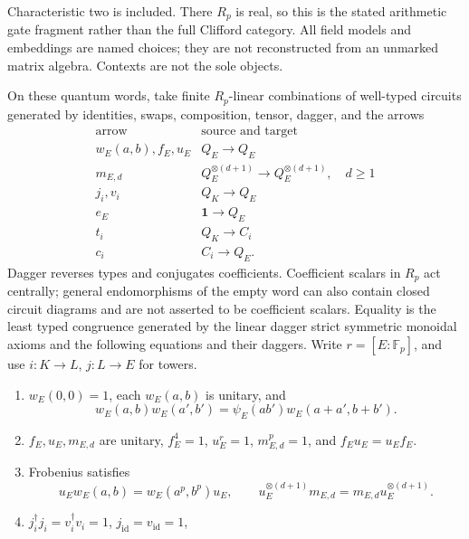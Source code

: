 \begin{scope}
Characteristic two is included. There $R_p$ is real, so this is the stated
arithmetic gate fragment rather than the full Clifford category. All field
models and embeddings are named choices; they are not reconstructed from an
unmarked matrix algebra. Contexts are not the sole objects.
\end{scope}

\begin{definition}
On these quantum words, take finite $R_p$-linear combinations of well-typed
circuits generated by identities, swaps, composition, tensor, dagger, and
the arrows
\[
\begin{array}{c|c}
 \text{arrow}&\text{source and target}\\ \hline
 w_E(a,b),f_E,u_E&Q_E\longrightarrow Q_E\\
 m_{E,d}&Q_E^{\otimes(d+1)}\longrightarrow Q_E^{\otimes(d+1)},\quad d\geq1\\
 j_i,v_i&Q_K\longrightarrow Q_E\\
 e_E&\mathbf1\longrightarrow Q_E\\
 t_i&Q_K\longrightarrow C_i\\
 c_i&C_i\longrightarrow Q_E .
\end{array}
\]
Dagger reverses types and conjugates coefficients. Coefficient scalars in
$R_p$ act centrally; general endomorphisms of the empty word can also contain
closed circuit diagrams and are not asserted to be coefficient scalars.
Equality is the least typed congruence generated by the linear dagger strict
symmetric monoidal axioms and the following equations and their daggers.
Write $r=[E:\mathbb F_p]$, and use $i:K\to L$, $j:L\to E$ for towers.
\begin{enumerate}
\item $w_E(0,0)=1$, each $w_E(a,b)$ is unitary, and
\[
 w_E(a,b)w_E(a',b')=\psi_E(ab')w_E(a+a',b+b').
\]
\item $f_E,u_E,m_{E,d}$ are unitary,
$f_E^4=1$, $u_E^r=1$, $m_{E,d}^{p}=1$, and $f_Eu_E=u_Ef_E$.
\item Frobenius satisfies
\[
 u_Ew_E(a,b)=w_E(a^p,b^p)u_E,\qquad
 u_E^{\otimes(d+1)}m_{E,d}=m_{E,d}u_E^{\otimes(d+1)}.
\]
\item $j_i^\dagger j_i=v_i^\dagger v_i=1$,
$j_{\mathrm{id}}=v_{\mathrm{id}}=1$,

\end{enumerate}
\end{definition}

